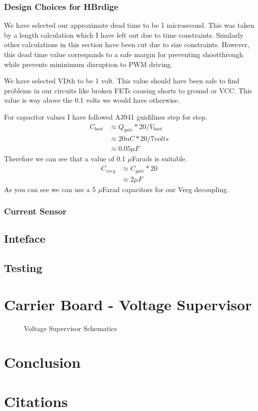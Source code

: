 \documentclass[12pt]{article}
\newcommand{\figuremine}[2]{
\begin{figure}[H]
\noindent\makebox[\textwidth]{
 \texttt{[image: \#1]}}
 \caption{#2}
\end{figure}
}
\begin{document}
\subsubsection{Design Choices for HBrdige}
We have selected our approximate dead time to be 1 microsecond. This was taken by a length calculation which I have left out due to time constraints. Similarly other calculations in this section have been cut due to size constraints. However, this dead time value correspands to a safe margin for preventing shootthrough while prevents mininimum disruption to PWM driving.

We have selected VDth to be 1 volt. This value should have been safe to find problems in our circuits like broken FETs causing shorts to ground or VCC. This value is way above the 0.1 volts we would have otherwise.

For capacitor values I have followed A3941 guidilines step for step.  
\begin{align}
C_{boot} &\approx Q_{gate} * 20 / V_{boot}
\\ &\approx 20 nC * 20 / 7 volts
\\ &\approx 0.05 \mu F
\end{align}
Therefore we can see that a value of 0.1 $\mu$Farads is suitable.
\begin{align}
C_{vreg} &\approx C_{gate} * 20
\\ &\approx 2 \mu F
\end{align}
As you can see we can use a 5 $\mu$Farad capacitors for our Vreg decoupling.
\subsubsection{Current Sensor}
\subsection{Inteface}
\subsection{Testing}

\section{Carrier Board - Voltage Supervisor}
\figuremine{~/ece445/Chalk-Bot/Hardware/Carrier/page1.png}{Voltage Supervisor Schematics}
\section{Conclusion}
\section{Citations}


 
\end{document}

